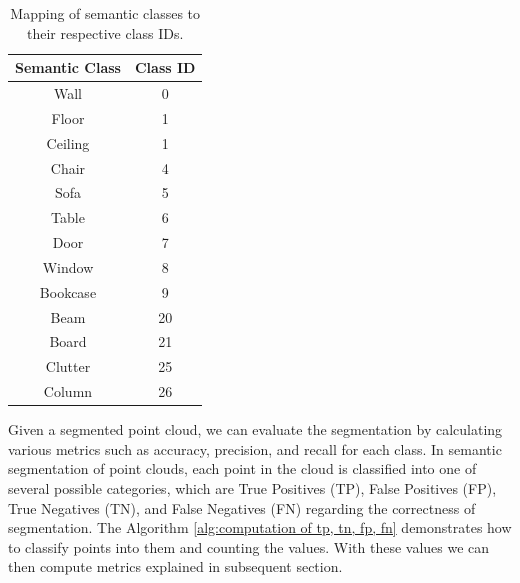\documentclass[11pt, a4paper,oneside,chapterprefix=false]{scrbook}
\begin{document}
\begin{table}[H]
    \centering
    \begin{tabular}{|c|c|}
        \hline
        \textbf{Semantic Class} & \textbf{Class ID} \\
        \hline
        Wall & 0 \\
        Floor & 1 \\
        Ceiling & 1 \\
        Chair & 4 \\
        Sofa & 5 \\
        Table & 6 \\
        Door & 7 \\
        Window & 8 \\
        Bookcase & 9 \\
        Beam & 20 \\
        Board & 21 \\
        Clutter & 25 \\
        Column & 26 \\
        \hline
    \end{tabular}
    \caption{Mapping of semantic classes to their respective class IDs.}
    \label{tab:semantic_classes}
\end{table}

Given a segmented point cloud, we can evaluate the segmentation by calculating various metrics such as accuracy, precision, and recall for each class. In semantic segmentation of point clouds, each point in the cloud is classified into one of several possible categories, which are True Positives (TP), False Positives (FP), True Negatives (TN), and False Negatives (FN) regarding the correctness of segmentation. The Algorithm \ref{alg:computation of tp, tn, fp, fn} demonstrates how to classify points into them and counting the values. With these values we can then compute metrics explained in subsequent section.  
\end{document}
